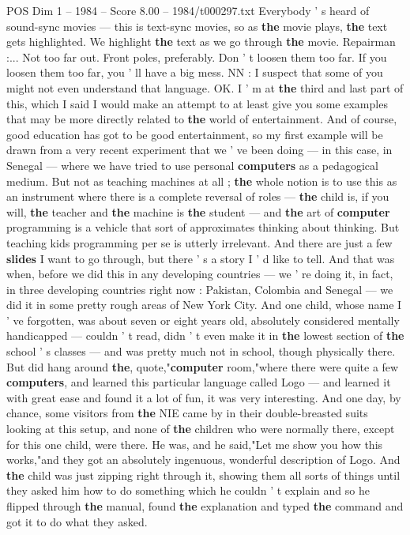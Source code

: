 \begin{textsample}{POS Dim 1 – 1984 – Score 8.00 – 1984/t000297.txt}
Everybody ' s heard of sound-sync movies — this is text-sync movies, so as \textbf{the} movie plays, \textbf{the} text gets highlighted.
We highlight \textbf{the} text as we go through \textbf{the} movie.
Repairman :...
Not too far out.
Front poles, preferably.
Don ' t loosen them too far.
If you loosen them too far, you ' ll have a big mess.
NN : I suspect that some of you might not even understand that language.
OK.
I ' m at \textbf{the} third and last part of this, which I said I would make an attempt to at least give you some examples that may be more directly related to \textbf{the} world of entertainment.
And of course, good education has got to be good entertainment, so my first example will be drawn from a very recent experiment that we ' ve been doing — in this case, in Senegal — where we have tried to use personal \textbf{computers} as a pedagogical medium.
But not as teaching machines at all ; \textbf{the} whole notion is to use this as an instrument where there is a complete reversal of roles — \textbf{the} child is, if you will, \textbf{the} teacher and \textbf{the} machine is \textbf{the} student — and \textbf{the} art of \textbf{computer} programming is a vehicle that sort of approximates thinking about thinking.
But teaching kids programming per se is utterly irrelevant.
And there are just a few \textbf{slides} I want to go through, but there ' s a story I ' d like to tell.
And that was when, before we did this in any developing countries — we ' re doing it, in fact, in three developing countries right now : Pakistan, Colombia and Senegal — we did it in some pretty rough areas of New York City.
And one child, whose name I ' ve forgotten, was about seven or eight years old, absolutely considered mentally handicapped — couldn ' t read, didn ' t even make it in \textbf{the} lowest section of \textbf{the} school ' s classes — and was pretty much not in school, though physically there.
But did hang around \textbf{the}, quote,"\textbf{computer} room,"where there were quite a few \textbf{computers}, and learned this particular language called Logo — and learned it with great ease and found it a lot of fun, it was very interesting.
And one day, by chance, some visitors from \textbf{the} NIE came by in their double-breasted suits looking at this setup, and none of \textbf{the} children who were normally there, except for this one child, were there.
He was, and he said,"Let me show you how this works,"and they got an absolutely ingenuous, wonderful description of Logo.
And \textbf{the} child was just zipping right through it, showing them all sorts of things until they asked him how to do something which he couldn ' t explain and so he flipped through \textbf{the} manual, found \textbf{the} explanation and typed \textbf{the} command and got it to do what they asked.

\end{textsample}
